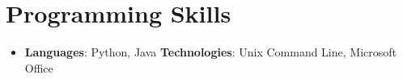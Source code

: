 \documentclass[letterpaper,11pt]{article}
\newcommand{\resumeSubHeadingListStart}{\begin{itemize}[leftmargin=*]}
\newcommand{\resumeSubHeadingListEnd}{\end{itemize}}
\begin{document}
\section{Programming Skills}
 \resumeSubHeadingListStart
   \item{
     \textbf{Languages}{: Python, Java}
     \hfill
     \textbf{Technologies}{: Unix Command Line, Microsoft Office}
   }
 \resumeSubHeadingListEnd

\end{document}
